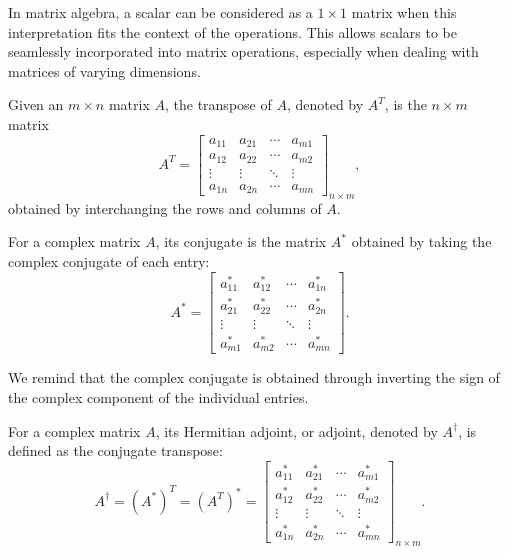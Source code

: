 \documentclass[12pt]{article}
\begin{document}
In matrix algebra, a scalar can be considered as a $1 \times 1$ matrix when this interpretation fits the context of the operations. This allows scalars to be seamlessly incorporated into matrix operations, especially when dealing with matrices of varying dimensions.

\begin{definition}[Transpose]
    Given an $m \times n$ matrix $A$, the transpose of $A$, denoted by $A^{T}$, is the $n \times m$ matrix
    \[
    A^{T} =
    \begin{bmatrix}
    a_{11} & a_{21} & \cdots & a_{m1} \\
    a_{12} & a_{22} & \cdots & a_{m2} \\
    \vdots & \vdots & \ddots & \vdots \\
    a_{1n} & a_{2n} & \cdots & a_{mn}
    \end{bmatrix}_{n \times m},
    \]
    obtained by interchanging the rows and columns of $A$.
\end{definition}

\begin{definition}[Conjugate]
    For a complex matrix $A$, its conjugate is the matrix $A^{*}$ obtained by taking the complex conjugate of each entry:
    \[
    A^{*} =
    \begin{bmatrix}
    a_{11}^{*} & a_{12}^{*} & \cdots & a_{1n}^{*} \\
    a_{21}^{*} & a_{22}^{*} & \cdots & a_{2n}^{*} \\
    \vdots & \vdots & \ddots & \vdots \\
    a_{m1}^{*} & a_{m2}^{*} & \cdots & a_{mn}^{*}
    \end{bmatrix}.
    \]
\end{definition}

We remind that the complex conjugate is obtained through inverting the sign of the complex component of the individual entries. 

\begin{definition}[Adjoint]
    For a complex matrix $A$, its Hermitian adjoint, or adjoint, denoted by $A^{\dagger}$, is defined as the conjugate transpose:
    \[
    A^{\dagger} = (A^{*})^{T} = (A^{T})^{*} =
    \begin{bmatrix}
    a_{11}^{*} & a_{21}^{*} & \cdots & a_{m1}^{*} \\
    a_{12}^{*} & a_{22}^{*} & \cdots & a_{m2}^{*} \\
    \vdots & \vdots & \ddots & \vdots \\
    a_{1n}^{*} & a_{2n}^{*} & \cdots & a_{mn}^{*}
    \end{bmatrix}_{n \times m}.
    \]
\end{definition}
\end{document}
